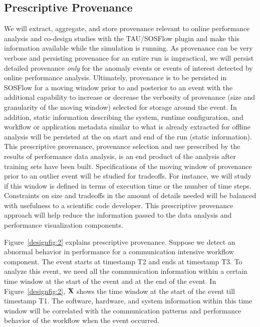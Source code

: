 \subsection{Prescriptive Provenance}
\label{subsection:features}
We will extract, aggregate, and store provenance relevant to online performance analysis and co-design studies with the TAU/SOSFlow plugin and make this information available while the simulation is running.  As provenance can be very verbose and persisting provenance for an entire run is impractical, we will persist detailed provenance {\em only} for the anomaly events or events of interest detected by online performance analysis.  Ultimately, provenance is to be persisted in SOSFlow for a moving window prior to and posterior to an event with the additional capability to increase or decrease the verbosity of provenance (size and granularity of the moving window) selected for storage around the event.  In addition, static information describing the system, runtime configuration, and  workflow or application metadata similar to what is already extracted for offline analysis will be persisted at the on start and end of the run (static information).  This prescriptive provenance,  provenance selection and use prescribed by the results of performance data analysis, is an end product of the analysis after training sets have been built.
Specifications of the moving window of provenance prior to an outlier event will be studied for tradeoffs.  For instance, we will study if this window is defined in terms of execution time or the number of time steps.  Constraints on size and tradeoffs in the amount of details needed will be balanced with usefulness to a scientific code developer.
This prescriptive provenance approach will help reduce the information passed to the data analysis and performance visualization components.

Figure~\ref{designfig:2} explains prescriptive provenance. Suppose we detect an abnormal behavior in performance for a communication intensive workflow component. The event starts at timestamp T2 and ends at timestamp T3. To analyze this event, we need all the communication information within a certain time window at the start of the event and at the end of the event. In Figure~\ref{designfig:2}, ${\bf{X}}$ shows the time window at the start of the event till timestamp T1. The software, hardware, and system information within this time window will be correlated with the communication patterns and performance behavior of the workflow when the event occurred.

